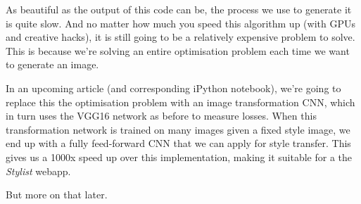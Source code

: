 \documentclass[11pt]{article}
\begin{document}
As beautiful as the output of this code can be, the process we use to
generate it is quite slow. And no matter how much you speed this
algorithm up (with GPUs and creative hacks), it is still going to be a
relatively expensive problem to solve. This is because we're solving an
entire optimisation problem each time we want to generate an image.

In an upcoming article (and corresponding iPython notebook), we're going
to replace this the optimisation problem with an image transformation
CNN, which in turn uses the VGG16 network as before to measure losses.
When this transformation network is trained on many images given a fixed
style image, we end up with a fully feed-forward CNN that we can apply
for style transfer. This gives us a 1000x speed up over this
implementation, making it suitable for a the \emph{Stylist} webapp.

But more on that later.


    
    
    
    
\end{document}
